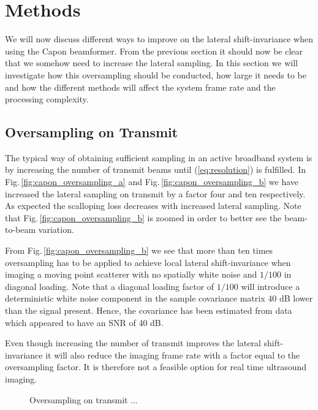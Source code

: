 \documentclass[journal]{IEEEtran}
\newcommand{\img}{img/}
\begin{document}
\section{Methods}
We will now discuss different ways to improve on the lateral shift-invariance when using the Capon beamformer. From the previous section it should now be clear that we somehow need to increase the lateral sampling. In this section we will investigate how this oversampling should be conducted, how large it needs to be and how the different methods will affect the system frame rate and the processing complexity.

\subsection{Oversampling on Transmit}
The typical way of obtaining sufficient sampling in an active broadband system is by increasing the number of transmit beams until (\ref{eq:resolution}) is fulfilled. In Fig.\,\ref{fig:capon_oversampling_a} and Fig.\,\ref{fig:capon_oversampling_b} we have increased the lateral sampling on transmit by a factor four and ten respectively. As expected the scalloping loss decreases with increased lateral sampling. Note that Fig.\,\ref{fig:capon_oversampling_b} is zoomed in order to better see the beam-to-beam variation.

From Fig.\,\ref{fig:capon_oversampling_b} we see that more than ten times oversampling has to be applied to achieve local lateral shift-invariance when imaging a moving point scatterer with no spatially white noise and $1/100$ in diagonal loading. Note that a diagonal loading factor of $1/100$ will introduce a deterministic white noise component in the sample covariance matrix $40$ dB lower than the signal present. Hence, the covariance has been estimated from data which appeared to have an SNR of 40 dB.

Even though increasing the number of transmit improves the lateral shift-invariance it will also reduce the imaging frame rate with a factor equal to the oversampling factor. It is therefore not a feasible option for real time ultrasound imaging.

\begin{figure*}[!t]
\centerline{
\subfloat[]{
\texttt{[image: \\img capon\_L=32\_K=1\_d=001\_4x\_oversampling\_2\_zoomed.eps]}\label{fig:capon_oversampling_a}
}
\subfloat[]{
\texttt{[image: \\img capon\_L=32\_K=1\_d=001\_10x\_oversampling\_2\_zoomed.eps]}\label{fig:capon_oversampling_b}
}
}
\caption{Oversampling on transmit ...}
\label{fig:capon_oversampling}
\end{figure*}
\end{document}
